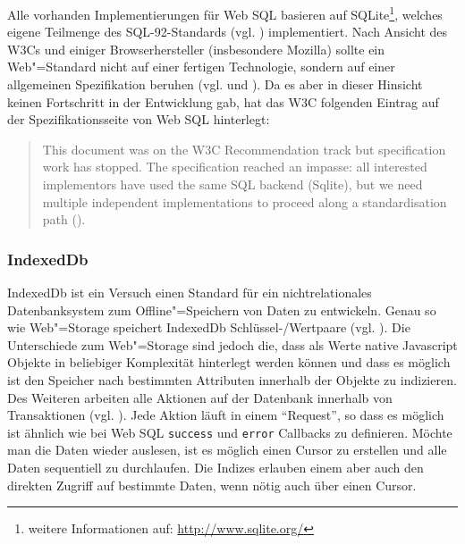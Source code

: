 Alle vorhanden Implementierungen für Web \ac{SQL} basieren auf SQLite\footnote{weitere Informationen auf: \url{http://www.sqlite.org/}}, welches eigene Teilmenge des SQL-92-Standards (vgl. \cite{SQL92}) implementiert. Nach Ansicht des \ac{W3C}s und einiger Browserhersteller (insbesondere Mozilla) sollte ein Web"=Standard nicht auf einer fertigen Technologie, sondern auf einer allgemeinen Spezifikation beruhen (vgl. \cite{W3C2010} und \cite{Ranganathan2010}). Da es aber in dieser Hinsicht keinen Fortschritt in der Entwicklung gab, hat das \ac{W3C} folgenden Eintrag auf der Spezifikationsseite von Web \ac{SQL} hinterlegt:
\begin{quotation}
 This document was on the W3C Recommendation track but specification work has stopped. The specification reached an impasse: all interested implementors have used the same SQL backend (Sqlite), but we need multiple independent implementations to proceed along a standardisation path (\cite{W3C2010}).
\end{quotation} 

\subsubsection*{IndexedDb}
IndexedDb ist ein Versuch einen Standard für ein nichtrelationales Datenbanksystem zum Offline"=Speichern von Daten zu entwickeln. Genau so wie Web"=Storage speichert IndexedDb Schlüssel-/Wertpaare (vgl. \cite{Mehta2012}). Die Unterschiede zum Web"=Storage sind jedoch die, dass als Werte native Javascript Objekte in beliebiger Komplexität hinterlegt werden können und dass es möglich ist den Speicher nach bestimmten Attributen innerhalb der Objekte zu indizieren. Des Weiteren arbeiten alle Aktionen auf der Datenbank innerhalb von Transaktionen (vgl. \cite{MDN2011}).  Jede Aktion läuft in einem "`Request"', so dass es möglich ist ähnlich wie bei Web \ac{SQL} \texttt{success} und \texttt{error} Callbacks zu definieren. Möchte man die Daten wieder auslesen, ist es möglich einen Cursor zu erstellen und alle Daten sequentiell zu durchlaufen. Die Indizes erlauben einem aber auch den direkten Zugriff auf bestimmte Daten, wenn nötig auch über einen Cursor.

